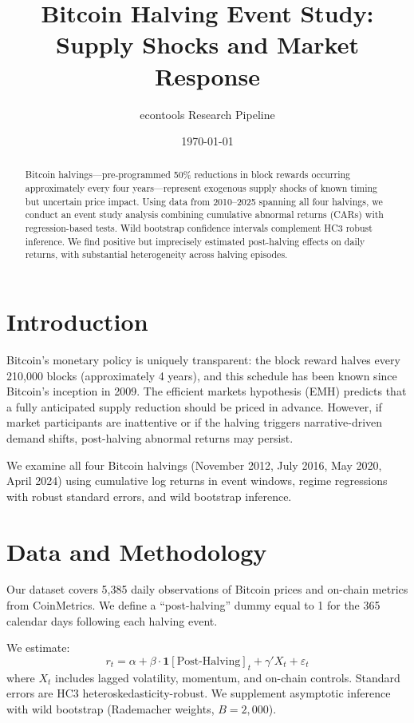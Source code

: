 \documentclass[12pt,a4paper]{article}
\title{Bitcoin Halving Event Study:\\
\large Supply Shocks and Market Response}
\author{econtools Research Pipeline}
\date{\today}
\begin{document}
\maketitle

\begin{abstract}
Bitcoin halvings---pre-programmed 50\% reductions in block rewards occurring
approximately every four years---represent exogenous supply shocks of known
timing but uncertain price impact. Using data from 2010--2025 spanning all
four halvings, we conduct an event study analysis combining cumulative
abnormal returns (CARs) with regression-based tests. Wild bootstrap
confidence intervals complement HC3 robust inference.
We find positive but imprecisely estimated post-halving effects on daily
returns, with substantial heterogeneity across halving episodes.
\end{abstract}

\section{Introduction}

Bitcoin's monetary policy is uniquely transparent: the block reward halves
every 210,000 blocks (approximately 4 years), and this schedule has been
known since Bitcoin's inception in 2009. The efficient markets hypothesis
(EMH) predicts that a fully anticipated supply reduction should be priced
in advance. However, if market participants are inattentive or if the
halving triggers narrative-driven demand shifts, post-halving abnormal
returns may persist.

We examine all four Bitcoin halvings (November 2012, July 2016, May 2020,
April 2024) using cumulative log returns in event windows, regime
regressions with robust standard errors, and wild bootstrap inference.

\section{Data and Methodology}

Our dataset covers 5,385 daily observations of Bitcoin prices and
on-chain metrics from CoinMetrics. We define a ``post-halving'' dummy
equal to 1 for the 365 calendar days following each halving event.

We estimate:
\begin{equation}
r_t = \alpha + \beta \cdot \mathbf{1}[\text{Post-Halving}]_t + \gamma' X_t + \varepsilon_t
\end{equation}
where $X_t$ includes lagged volatility, momentum, and on-chain controls.
Standard errors are HC3 heteroskedasticity-robust. We supplement
asymptotic inference with wild bootstrap (Rademacher weights, $B=2{,}000$).
\end{document}
